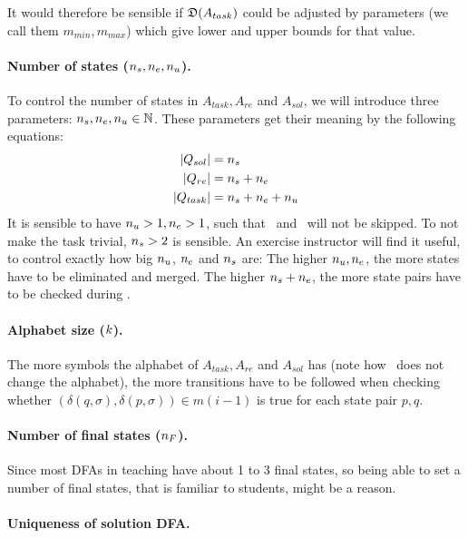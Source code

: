 It would therefore be sensible if $\mathfrak{D}(A_{task})$ could be adjusted by parameters (we call them $m_{min}, m_{max}$) which give lower and upper bounds for that value.

\paragraph*{Number of states \texorpdfstring{(${n_s}, {n_e}, {n_u}$)}{}.}

To control the number of states in $A_{task}, A_{re}$ and $A_{sol}$, we will introduce three parameters: ${n_s}, {n_e}, {n_u} \in \mathbb{N}$. These parameters get their meaning by the following equations:
\begin{align*}
    |Q_{sol}| &= {n_s} \\
    |Q_{re}| &= {n_s} + {n_e} \\
    |Q_{task}| &= {n_s} + {n_e} + {n_u}
\end{align*}
It is sensible to have ${n_u} > 1, {n_e} > 1$, such that \RemUnr\ and \RemEq\ will not be skipped. To not make the task trivial, ${n_s} > 2$ is sensible. An exercise instructor will find it useful, to control exactly how big ${n_u}$, ${n_e}$ and ${n_s}$ are: The higher ${n_u}, {n_e}$, the more states have to be eliminated and merged. The higher ${n_s} + {n_e}$, the more state pairs have to be checked during \CompDist.

\paragraph*{Alphabet size \texorpdfstring{($k$)}{}.}

The more symbols the alphabet of $A_{task}, A_{re}$ and $A_{sol}$ has (note how \MinAlg\ does not change the alphabet), the more transitions have to be followed when checking whether $(\delta(q,\sigma),\delta(p,\sigma))\in m(i-1)$ is true for each state pair $p,q$.

\paragraph*{Number of final states \texorpdfstring{(${n_F}$)}{}.}

Since most DFAs in teaching have about 1 to 3 final states, so being able to set a number of final states, that is familiar to students, might be a reason.

\paragraph*{Uniqueness of solution DFA.}

